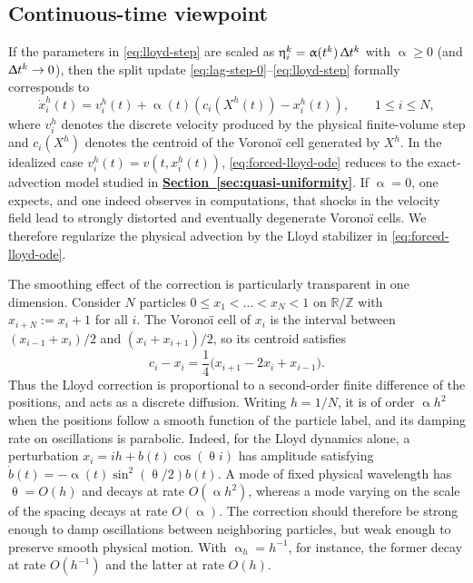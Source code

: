 \documentclass[letterpaper,11pt,twoside]{article}
\numberwithin{figure}{section}
\numberwithin{table}{section}
\theoremstyle{cpamplain}
\theoremstyle{cpamdefinition}
\newcommand{\R}{\mathbb{R}}
\newcommand{\Secref}[1]{\textbf{\hyperref[#1]{Section~\ref*{#1}}}}
\let\alpha\upalpha
\let\eta\upeta
\let\theta\uptheta
\let\Delta\Updelta
\renewcommand{\le}{\leqslant}
\renewcommand{\ge}{\geqslant}
\numberwithin{equation}{section}
\begin{document}
\subsection{Continuous-time viewpoint}\label{sec:continuous}

If the parameters in \eqref{eq:lloyd-step} are scaled as $\eta_i^k=\alpha(t^k)\,\Delta t^k$ with $\alpha\ge 0$
(and $\Delta t^k\to0$), then the split update \eqref{eq:lag-step-0}--\eqref{eq:lloyd-step}
formally corresponds to 
\begin{equation}\label{eq:forced-lloyd-ode}
\dot x_i^h(t)=v_i^h(t)+\alpha(t)\left(c_i(X^h(t))-x_i^h(t)\right),
\qquad 1\le i\le N,
\end{equation}
where $v_i^h$ denotes the discrete velocity produced by the physical finite-volume step and $c_i(X^h)$ denotes the centroid of the Vorono\"i cell generated by $X^h$.
In the idealized case $v_i^h(t)=v(t,x_i^h(t))$, \eqref{eq:forced-lloyd-ode} reduces to the exact-advection model studied in \Secref{sec:quasi-uniformity}.
If $\alpha=0$, one expects, and one indeed observes in computations, that shocks in the velocity field lead to strongly distorted and eventually degenerate Vorono\"i cells. We therefore regularize the physical advection by the Lloyd stabilizer in \eqref{eq:forced-lloyd-ode}.

The smoothing effect of the correction is particularly transparent in one dimension.
Consider $N$ particles $0\le x_1<\dots<x_N<1$ on $\R/\mathbb Z$ with $x_{i+N}:=x_i+1$ for all $i$.
The Vorono\"i cell of $x_i$ is the interval between
$(x_{i-1}+x_i)/2$ and $(x_i+x_{i+1})/2$, so its centroid satisfies
\[
c_i-x_i=\frac14\bigl(x_{i+1}-2x_i+x_{i-1}\bigr).
\]
Thus the Lloyd correction is proportional to a second-order finite difference of the positions, and acts as a discrete diffusion.
Writing $h=1/N$, it is of order $\alpha h^2$ when the positions follow a smooth function of the particle label, and its damping rate on oscillations is parabolic. Indeed, for the Lloyd dynamics alone, a perturbation $x_i=ih+b(t)\cos(\theta i)$ has amplitude satisfying
\(\dot b(t)=-\alpha(t)\sin^2(\theta/2)b(t).
\)
A mode of fixed physical wavelength has $\theta=O(h)$ and decays at rate
$O(\alpha h^2)$, whereas a mode varying on the scale of the spacing decays
at rate $O(\alpha)$.
The correction should therefore be strong enough to damp oscillations between neighboring particles, but weak enough to preserve smooth physical motion. With $\alpha_h=h^{-1}$, for instance, the former decay at rate $O(h^{-1})$ and the latter at rate $O(h)$.
\end{document}
